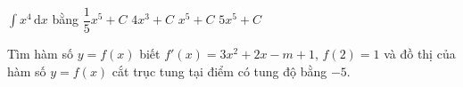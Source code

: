 \begin{ex}%
	$\displaystyle\int x^4  \mathrm{\,d} x$ bằng
	 \choice
		 {\True $\dfrac{1}{5} x^5+C$}
		{$4x^3+C$} 
		{$x^5+C$} 
		{$5x^5+C$} 
\end{ex}

\begin{bt}%
	Tìm hàm số $y=f(x)$  biết $f'(x)=3x^2+2x-m+1$, $f(2)=1$ và đồ thị của hàm số $y=f(x)$ cắt trục tung tại điểm có tung độ bằng $-5$.
\end{bt}

